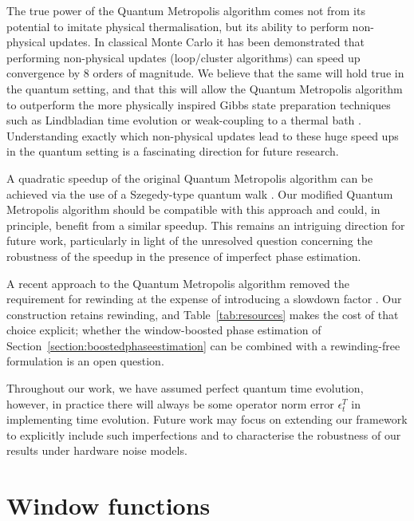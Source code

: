 \documentclass[aps,floatfix,10pt,amssymb,amsfont,amsmath,superscriptaddress,float,nofootinbib,longbibliography,nobalancelastpage,twocolumn]{revtex4-2}
\begin{document}
The true power of the Quantum Metropolis algorithm comes not from its potential to imitate physical thermalisation, but its ability to perform non-physical updates. In classical Monte Carlo it has been demonstrated \cite{todo2019parallel} that performing non-physical updates (loop/cluster algorithms) can speed up convergence by 8 orders of magnitude. We believe that the same will hold true in the quantum setting, and that this will allow the Quantum Metropolis algorithm to outperform the more physically inspired Gibbs state preparation techniques such as Lindbladian time evolution \cite{chen2023quantumthermalstatepreparation,rall2023thermal} or weak-coupling to a thermal bath \cite{chen2021fast,shtanko2021preparing}. Understanding exactly which non-physical updates lead to these huge speed ups in the quantum setting is a fascinating direction for future research.


A quadratic speedup \cite{yung2012quantum} of the original Quantum Metropolis algorithm can be achieved via the use of a Szegedy-type quantum walk \cite{szegedy2004quantum}. Our modified Quantum Metropolis algorithm should be compatible with this approach and could, in principle, benefit from a similar speedup. This remains an intriguing direction for future work, particularly in light of the unresolved question concerning the robustness of the speedup in the presence of imperfect phase estimation. 

A recent approach to the Quantum Metropolis algorithm removed the requirement for rewinding at the expense of introducing a slowdown factor \cite{wocjan2023szegedy}. Our construction retains rewinding, and Table~\ref{tab:resources} makes the cost of that choice explicit; whether the window-boosted phase estimation of Section~\ref{section:boostedphaseestimation} can be combined with a rewinding-free formulation is an open question.

Throughout our work, we have assumed perfect quantum time evolution, however, in practice there will always be some operator norm error $\epsilon^T_t$ in implementing time evolution. Future work may focus on extending our framework to explicitly include such imperfections and to characterise the robustness of our results under hardware noise models.



\appendix
\onecolumngrid    
\section{Window functions}
\label{section:appendix}
\end{document}

